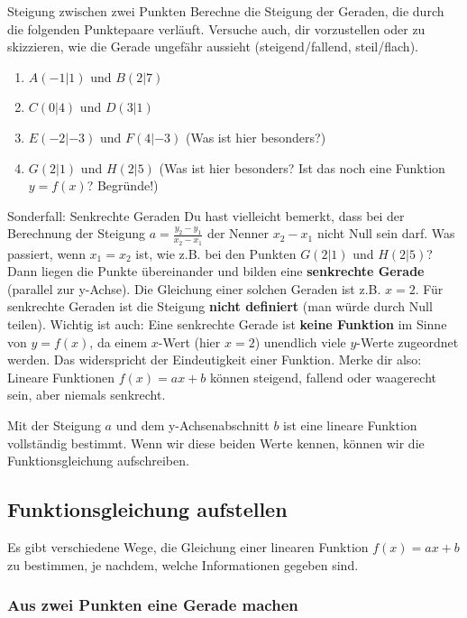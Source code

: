 \begin{aufgabenumgebung}{Steigung zwischen zwei Punkten}
Berechne die Steigung der Geraden, die durch die folgenden Punktepaare verläuft. Versuche auch, dir vorzustellen oder zu skizzieren, wie die Gerade ungefähr aussieht (steigend/fallend, steil/flach).
\begin{enumerate}
    \item $A(-1|1)$ und $B(2|7)$
    \item $C(0|4)$ und $D(3|1)$
    \item $E(-2|-3)$ und $F(4|-3)$ (Was ist hier besonders?)
    \item $G(2|1)$ und $H(2|5)$ (Was ist hier besonders? Ist das noch eine Funktion $y=f(x)$? Begründe!)
\end{enumerate}
\end{aufgabenumgebung}


\begin{infoboxumgebung}{Sonderfall: Senkrechte Geraden}
Du hast vielleicht bemerkt, dass bei der Berechnung der Steigung $a = \frac{y_2-y_1}{x_2-x_1}$ der Nenner $x_2-x_1$ nicht Null sein darf. Was passiert, wenn $x_1=x_2$ ist, wie z.B. bei den Punkten $G(2|1)$ und $H(2|5)$?
Dann liegen die Punkte übereinander und bilden eine \textbf{senkrechte Gerade} (parallel zur y-Achse). Die Gleichung einer solchen Geraden ist z.B. $x=2$.
Für senkrechte Geraden ist die Steigung \textbf{nicht definiert} (man würde durch Null teilen). Wichtig ist auch: Eine senkrechte Gerade ist \textbf{keine Funktion} im Sinne von $y=f(x)$, da einem $x$-Wert (hier $x=2$) unendlich viele $y$-Werte zugeordnet werden. Das widerspricht der Eindeutigkeit einer Funktion.
Merke dir also: Lineare Funktionen $f(x)=ax+b$ können steigend, fallend oder waagerecht sein, aber niemals senkrecht.
\end{infoboxumgebung}

Mit der Steigung $a$ und dem y-Achsenabschnitt $b$ ist eine lineare Funktion vollständig bestimmt. Wenn wir diese beiden Werte kennen, können wir die Funktionsgleichung aufschreiben.

\subsection{Funktionsgleichung aufstellen}

Es gibt verschiedene Wege, die Gleichung einer linearen Funktion $f(x)=ax+b$ zu bestimmen, je nachdem, welche Informationen gegeben sind.

\subsubsection{Aus zwei Punkten eine Gerade machen}

